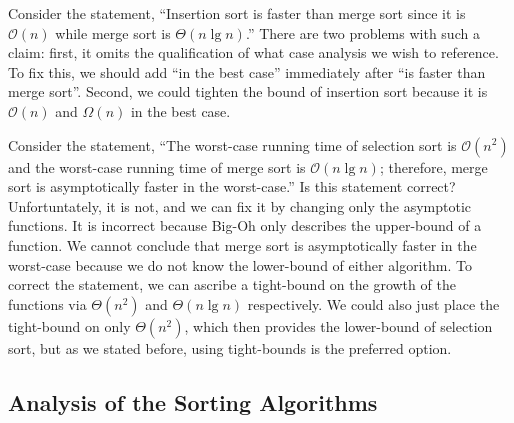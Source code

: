 \example Consider the statement, ``Insertion sort is faster than merge sort since it is $\mathcal{O}(n)$ while merge sort is $\Theta(n\lg{n})$.'' There are two problems with such a claim: first, it omits the qualification of what case analysis we wish to reference. To fix this, we should add ``in the best case'' immediately after ``is faster than merge sort''. Second, we could tighten the bound of insertion sort because it is $\mathcal{O}(n)$ and $\Omega(n)$ in the best case.

\example Consider the statement, ``The worst-case running time of selection sort is $\mathcal{O}(n^2)$ and the worst-case running time of merge sort is $\mathcal{O}(n\lg{n})$; therefore, merge sort is asymptotically faster in the worst-case.'' Is this statement correct? Unfortuntately, it is not, and we can fix it by changing only the asymptotic functions. It is incorrect because Big-Oh only describes the upper-bound of a function. We cannot conclude that merge sort is asymptotically faster in the worst-case because we do not know the lower-bound of either algorithm. To correct the statement, we can ascribe a tight-bound on the growth of the functions via $\Theta(n^2)$ and $\Theta(n\lg{n})$ respectively. We could also just place the tight-bound on only $\Theta(n^2)$, which then provides the lower-bound of selection sort, but as we stated before, using tight-bounds is the preferred option.

\subsection*{Analysis of the Sorting Algorithms}